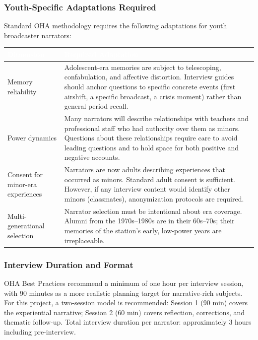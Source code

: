 \documentclass[11pt,letterpaper]{article}
\newcommand{\tableheader}[1]{\textbf{\sffamily\textcolor{white}{#1}}}
\begin{document}
\subsubsection{Youth-Specific Adaptations Required}

Standard OHA methodology requires the following adaptations for youth broadcaster narrators:

\begin{center}
\begin{tabularx}{\textwidth}{L{3.5cm}X}
\toprule
{}
\tableheader{Dimension} & \tableheader{Required Adaptation} \\
\midrule
Memory reliability & Adolescent-era memories are subject to telescoping, confabulation, and affective distortion. Interview guides should anchor questions to specific concrete events (first airshift, a specific broadcast, a crisis moment) rather than general period recall. \\
Power dynamics & Many narrators will describe relationships with teachers and professional staff who had authority over them as minors. Questions about these relationships require care to avoid leading questions and to hold space for both positive and negative accounts. \\
Consent for minor-era experiences & Narrators are now adults describing experiences that occurred as minors. Standard adult consent is sufficient. However, if any interview content would identify other minors (classmates), anonymization protocols are required. \\
Multi-generational selection & Narrator selection must be intentional about era coverage. Alumni from the 1970s--1980s are in their 60s--70s; their memories of the station's early, low-power years are irreplaceable. \\
\bottomrule
\end{tabularx}
\end{center}

\subsubsection{Interview Duration and Format}

OHA Best Practices recommend a minimum of one hour per interview session, with 90 minutes as a more realistic planning target for narrative-rich subjects. For this project, a two-session model is recommended: Session 1 (90 min) covers the experiential narrative; Session 2 (60 min) covers reflection, corrections, and thematic follow-up. Total interview duration per narrator: approximately 3 hours including pre-interview.
\end{document}
